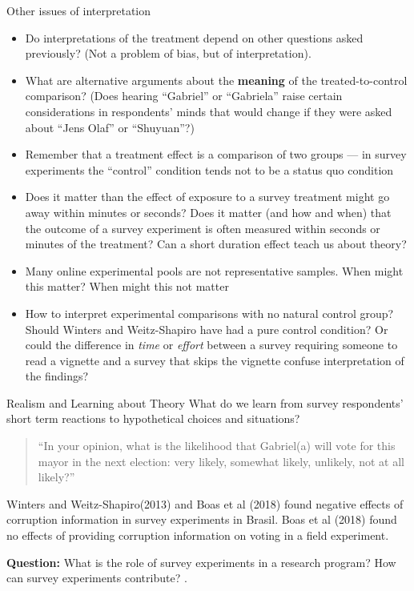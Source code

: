 \documentclass[
  ignorenonframetext,
]{beamer}
\providecommand{\tightlist}{%
  \setlength{\itemsep}{0pt}\setlength{\parskip}{0pt}}
\begin{document}
\begin{frame}[allowframebreaks]{Other issues of interpretation}
\protect\hypertarget{other-issues-of-interpretation}{}
\begin{itemize}
\tightlist
\item
  Do interpretations of the treatment depend on other questions asked
  previously? (Not a problem of bias, but of interpretation).
\item
  What are alternative arguments about the \textbf{meaning} of the
  treated-to-control comparison? (Does hearing ``Gabriel'' or
  ``Gabriela'' raise certain considerations in respondents' minds that
  would change if they were asked about ``Jens Olaf'' or ``Shuyuan''?)
\item
  Remember that a treatment effect is a comparison of two groups --- in
  survey experiments the ``control'' condition tends not to be a status
  quo condition
\item
  Does it matter than the effect of exposure to a survey treatment might
  go away within minutes or seconds? Does it matter (and how and when)
  that the outcome of a survey experiment is often measured within
  seconds or minutes of the treatment? Can a short duration effect teach
  us about theory?
\item
  Many online experimental pools are not representative samples. When
  might this matter? When might this not matter
\item
  How to interpret experimental comparisons with no natural control
  group? Should Winters and Weitz-Shapiro have had a pure control
  condition? Or could the difference in \emph{time} or \emph{effort}
  between a survey requiring someone to read a vignette and a survey
  that skips the vignette confuse interpretation of the findings?
\end{itemize}
\end{frame}

\begin{frame}{Realism and Learning about Theory}
\protect\hypertarget{realism-and-learning-about-theory}{}
What do we learn from survey respondents' short term reactions to
hypothetical choices and situations?

\begin{quote}
``In your opinion, what is the likelihood that Gabriel(a) will vote for
this mayor in the next election: very likely, somewhat likely, unlikely,
not at all likely?''
\end{quote}

Winters and Weitz-Shapiro(2013) and Boas et al (2018) found negative
effects of corruption information in survey experiments in Brasil. Boas
et al (2018) found no effects of providing corruption information on
voting in a field experiment.

\medskip

\textbf{Question:} What is the role of survey experiments in a research
program? How can survey experiments contribute? .
\end{frame}
\end{document}

